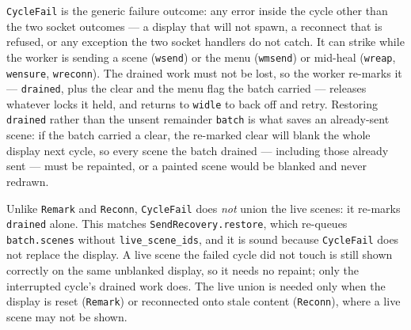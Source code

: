 \documentclass[a4paper,10pt,fleqn]{article}
\begin{document}
\texttt{CycleFail} is the generic failure outcome: any error inside the
cycle other than the two socket outcomes --- a display that will not spawn,
a reconnect that is refused, or any exception the two socket handlers do not
catch.  It can strike while the worker is sending a scene (\texttt{wsend}) or
the menu (\texttt{wmsend}) or mid-heal (\texttt{wreap}, \texttt{wensure},
\texttt{wreconn}).  The drained work must not be lost, so the worker re-marks
it --- \texttt{drained}, plus the clear and the menu flag the batch carried
--- releases whatever locks it held, and returns to \texttt{widle} to back off
and retry.  Restoring \texttt{drained} rather than the unsent remainder
\texttt{batch} is what saves an already-sent scene: if the batch carried a
clear, the re-marked clear will blank the whole display next cycle, so every
scene the batch drained --- including those already sent --- must be
repainted, or a painted scene would be blanked and never redrawn.

Unlike \texttt{Remark} and \texttt{Reconn}, \texttt{CycleFail} does \emph{not}
union the live scenes: it re-marks \texttt{drained} alone.  This matches
\texttt{SendRecovery.restore}, which re-queues \texttt{batch.scenes} without
\texttt{live\_scene\_ids}, and it is sound because \texttt{CycleFail} does not
replace the display.  A live scene the failed cycle did not touch is still
shown correctly on the same unblanked display, so it needs no repaint; only
the interrupted cycle's drained work does.  The live union is needed only when
the display is reset (\texttt{Remark}) or reconnected onto stale content
(\texttt{Reconn}), where a live scene may not be shown.
\end{document}
